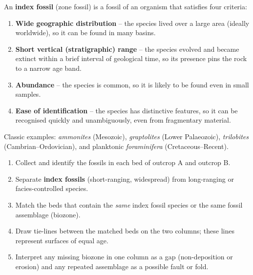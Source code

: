 \documentclass[11pt]{article}
\begin{document}
\begin{definition}
An \textbf{index fossil} (zone fossil) is a fossil of an organism that satisfies four criteria:
\begin{enumerate}
\item \textbf{Wide geographic distribution} -- the species lived over a large area (ideally worldwide), so it can be found in many basins.
\item \textbf{Short vertical (stratigraphic) range} -- the species evolved and became extinct within a brief interval of geological time, so its presence pins the rock to a narrow age band.
\item \textbf{Abundance} -- the species is common, so it is likely to be found even in small samples.
\item \textbf{Ease of identification} -- the species has distinctive features, so it can be recognised quickly and unambiguously, even from fragmentary material.
\end{enumerate}
Classic examples: \emph{ammonites} (Mesozoic), \emph{graptolites} (Lower Palaeozoic), \emph{trilobites} (Cambrian--Ordovician), and planktonic \emph{foraminifera} (Cretaceous--Recent).
\end{definition}

\begin{methode}
\begin{enumerate}
\item Collect and identify the fossils in each bed of outcrop A and outcrop B.
\item Separate \textbf{index fossils} (short-ranging, widespread) from long-ranging or facies-controlled species.
\item Match the beds that contain the \emph{same} index fossil species or the same fossil assemblage (biozone).
\item Draw tie-lines between the matched beds on the two columns; these lines represent surfaces of equal age.
\item Interpret any missing biozone in one column as a gap (non-deposition or erosion) and any repeated assemblage as a possible fault or fold.
\end{enumerate}
\end{methode}
\end{document}
